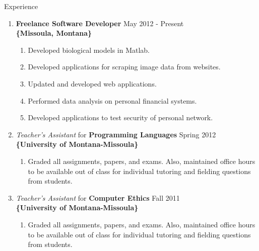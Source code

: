 \documentclass[oneside]{article}%
\begin{document}

\renewcommand{\footrulewidth}{1pt}


\noindent
\huge{Experience}
\normalsize
\begin{enumerate}[]
	\item \textbf{Freelance Software Developer} \hfill May 2012 - Present\\
		\textbf{\{Missoula, Montana\}}
		\begin{enumerate}[*]
			\item Developed biological models in Matlab.
			\item Developed applications for scraping image data from websites.
			\item Updated and developed web applications.
			\item Performed data analysis on personal financial systems.
			\item Developed applications to test security of personal network.
		\end{enumerate}

	\item \textit{Teacher's Assistant} for \textbf{Programming Languages} \hfill Spring 2012\\
		\textbf{\{University of Montana-Missoula\}}
		\begin{enumerate}[*]
			\item Graded all assignments, papers, and exams. Also, maintained office hours to be available out of class for individual tutoring and fielding questions from students.
		\end{enumerate}

	\item \textit{Teacher's Assistant} for \textbf{Computer Ethics} \hfill Fall 2011\\
		\textbf{\{University of Montana-Missoula\}}
		\begin{enumerate}[*]
			\item Graded all assignments, papers, and exams. Also, maintained office hours to be available out of class for individual tutoring and fielding questions from students.
		\end{enumerate}


\end{enumerate}
\end{document}
